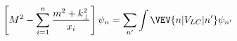 \begin{equation}
\left[M^2 - \sum_{i=1}^n\frac{m^2 + k^2_\perp}{x_i}\right] \psi_n
= \sum_{n'}\int \VEV{n|V_{LC}|n'} \psi_{n'}\end{equation}

